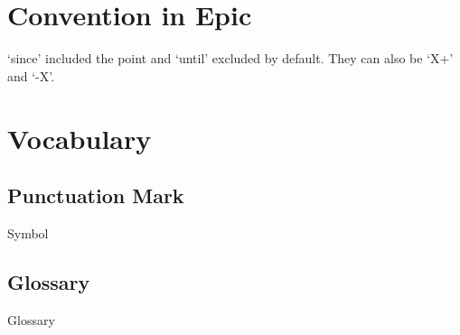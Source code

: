 \section{Convention in Epic}

`since' included the point and `until' excluded by default. They can also be `X+' and `-X'.

\section{Vocabulary}
\subsection{Punctuation Mark}
{Symbol}
\subsection{Glossary}
{Glossary}
